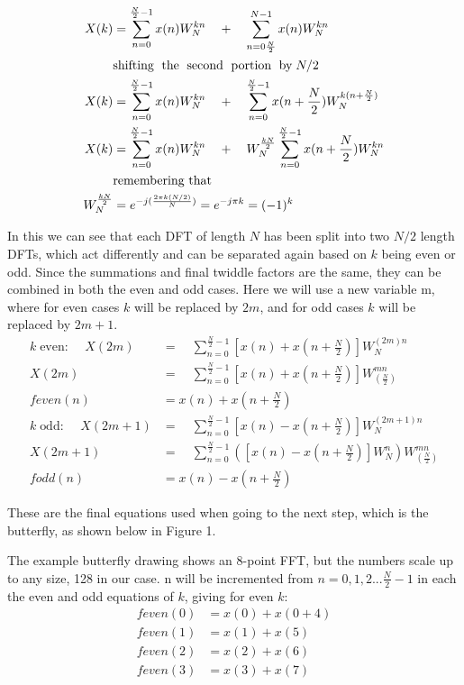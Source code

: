 \documentclass{bannerReport}
\begin{document}
\begin{align*}
	X(k) &= \sum^{\frac{N}{2}-1}_{n = 0}x(n)W^{kn}_N\quad + \quad \sum^{N-1}_{n = 0\frac{N}{2}}x(n)W^{kn}_N\\
	&\text{shifting\; the\; second\; portion\; by} \; N/2 \\
	X(k) &= \sum^{\frac{N}{2}-1}_{n = 0}x(n)W^{kn}_N\quad + \quad \sum^{\frac{N}{2}-1}_{n = 0}x(n +\frac{N}{2})W^{k(n + \frac{N}{2})}_N\\
	X(k) &= \sum^{\frac{N}{2}-1}_{n = 0}x(n)W^{kn}_N\quad + \quad W^{\frac{kN}{2}}_N\sum^{\frac{N}{2}-1}_{n = 0}x(n +\frac{N}{2})W^{kn}_{N}\\
	&\text{remembering that}
	\\W^{\frac{kN}{2}}_N &= e^{-j(\frac{2 \pi k(N/2)}{N} )} = e^{-j\pi k } = (-1)^k
\end{align*}

In this we can see that each DFT of length $N$ has been split into two $N/2$ length DFTs, which act differently and can be separated again based on $k$ being even or odd. Since the summations and final twiddle factors are the same, they can be combined in both the even and odd cases. Here we will use a new variable m, where for even cases $k$ will be replaced by $2m$, and for odd cases $k$ will be replaced by $2m + 1$.
\begin{align*}
	k\; \text{even: }\quad X(2m) &=\quad \sum^{\frac{N}{2}-1}_{n = 0}[x(n) + x(n +\frac{N}{2})]W^{(2m)n}_{N}\\
	X(2m) &=\quad \sum^{\frac{N}{2}-1}_{n = 0}[x(n) + x(n +\frac{N}{2})]W^{mn}_{(\frac{N}{2})}\\
	feven(n) &=  x(n) + x(n +\frac{N}{2}) \\
	k\; \text{odd: } \quad X(2m +1) &=\quad \sum^{\frac{N}{2}-1}_{n = 0}[x(n) - x(n +\frac{N}{2})]W^{(2m+1)n}_{N}\\
	X(2m +1) &=\quad \sum^{\frac{N}{2}-1}_{n = 0} \left( [x(n) - x(n +\frac{N}{2})]W^{n}_{N}\right) W^{mn}_{(\frac{N}{2})}\\
	fodd(n) &=  x(n) - x(n +\frac{N}{2})
\end{align*}


These are the final equations used when going to the next step, which is the butterfly, as shown below in Figure 1.



The example butterfly drawing shows an 8-point FFT, but the numbers scale up to any size, 128 in our case. n will be incremented from $ n = 0, 1, 2... \frac{N}{2} -1$ in each the even and odd equations of $k$, giving for even $k$:
\begin{align*}
	feven(0) &= x(0) + x(0 +4)\\
feven(1) &= x(1) + x(5)\\
feven(2) &= x(2) + x(6)\\
feven(3) &= x(3) + x(7)
\end{align*}
\end{document}
